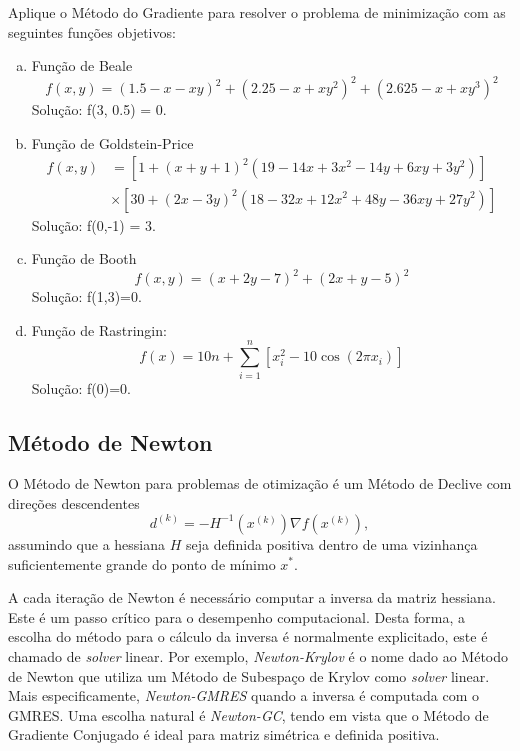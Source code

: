 \begin{exer}\label{exer:optFuns}
  Aplique o Método do Gradiente para resolver o problema de minimização com as seguintes funções objetivos:
  \begin{enumerate}[a)]
  \item Função de Beale
    \begin{equation}
      f(x,y) = (1.5-x-xy)^2 + (2.25-x+xy^2)^2 + (2.625-x+xy^3)^2
    \end{equation}
    Solução: f(3, 0.5) = 0.
  \item Função de Goldstein-Price
    \begin{align}
      f(x,y) &= \left[1+\left(x+y+1\right)^{2}\left(19-14x+3x^{2}-14y+6xy+3y^{2}\right)\right]\nonumber\\
      &\times \left[30+\left(2x-3y\right)^{2}\left(18-32x+12x^{2}+48y-36xy+27y^{2}\right)\right]
    \end{align}
    Solução: f(0,-1) = 3.
  \item Função de Booth
    \begin{equation}
      f(x,y) = \left( x + 2y -7\right)^{2} + \left(2x +y - 5\right)^{2}
    \end{equation}
    Solução: f(1,3)=0.
  \item Função de Rastringin:
    \begin{equation}
      f(x) = 10 n + \sum_{i=1}^n \left[x_i^2 - 10\cos(2 \pi x_i)\right]
    \end{equation}
    Solução: f(0)=0.
  \end{enumerate}
\end{exer}


\subsection{Método de Newton}

O Método de Newton{\newton} para problemas de otimização é um Método de Declive com direções descendentes
\begin{equation}
  d^{(k)} = -H^{-1}(x^{(k)})\nabla f(x^{(k)}),
\end{equation}
assumindo que a hessiana $H$ seja definida positiva dentro de uma vizinhança suficientemente grande do ponto de mínimo $x^*$.

\begin{obs}
  A cada iteração de Newton é necessário computar a inversa da matriz hessiana. Este é um passo crítico para o desempenho computacional. Desta forma, a escolha do método para o cálculo da inversa é normalmente explicitado, este é chamado de {\it solver} linear. Por exemplo, \emph{Newton-Krylov} é o nome dado ao Método de Newton que utiliza um Método de Subespaço de Krylov como {\it solver} linear. Mais especificamente, \emph{Newton-GMRES} quando a inversa é computada com o GMRES. Uma escolha natural é \emph{Newton-GC}, tendo em vista que o Método de Gradiente Conjugado é ideal para matriz simétrica e definida positiva.
\end{obs}

